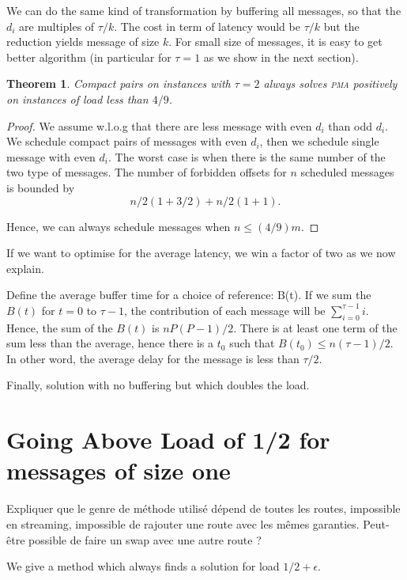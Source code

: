 \documentclass[10pt, conference, letterpaper]{IEEEtran}
\newtheorem{theorem}{Theorem}
\newcommand\pma{\textsc{pma}\xspace}
\begin{document}
We can do the same kind of transformation by buffering all 
messages, so that the $d_i$ are multiples of $\tau / k$. The cost in term
of latency would be $\tau / k$ but the reduction yields message of size $k$.
For small size of messages, it is easy to get better algorithm (in particular for $\tau =1$
as we show in the next section).
\begin{theorem}
Compact pairs on instances with $\tau =2$ always solves \pma positively on instances of load less than $4/9$.
\end{theorem}
\begin{proof}
We assume w.l.o.g that there are less message with even $d_i$ than odd $d_i$.
We schedule compact pairs of messages with even $d_i$, then we schedule single message with 
even $d_i$. The worst case is when there is the same number of the two type of messages.
The number of forbidden offsets for $n$ scheduled messages is bounded by 
$$ n/2 (1 + 3/2) + n/2(1 + 1). $$

Hence, we can always schedule messages when $n \leq (4/9)m$.

\end{proof}


If we want to optimise for the average latency, we win a factor of two as we now explain.

Define the average buffer time for a choice of reference: B(t). 
If we sum the $B(t)$ for $t=0$ to $\tau-1$, the contribution of each message 
will be $\sum_{i=0}^{\tau-1} i$. Hence, the sum of the $B(t)$ is 
$n P (P-1)/2$. There is at least one term of the sum less than the average,
hence there is a $t_0$ such that $B(t_0) \leq n (\tau-1)/2$. In other word, the average
delay for the message is less than $\tau/2$.



Finally, solution with no buffering but which doubles the load. 



\section{Going Above Load of 1/2 for messages of size one}


Expliquer que le genre de méthode utilisé dépend de toutes les routes,
impossible en streaming, impossible de rajouter une route avec les mêmes garanties.
Peut-être possible de faire un swap avec une autre route ?


We  give a method which always finds a solution for load $1/2 + \epsilon$.
\end{document}
